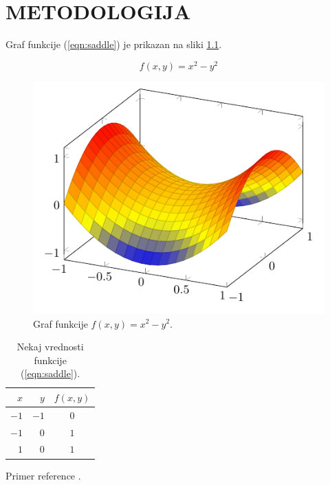 \chapter{METODOLOGIJA}

\noindent
Graf funkcije (\ref{eqn:saddle}) je prikazan na sliki \ref{fig:plot}.

\begin{equation}
    f(x, y) = x^2 - y^2
    \label{eqn:saddle}
\end{equation}

\begin{figure}[ht]
    \centering
    \includegraphics[width=0.6\linewidth]{images/plot.pdf}
    \caption{Graf funkcije $f(x, y) = x^2 - y^2$.}
    \label{fig:plot}
\end{figure}

\begin{table}[ht]
    \centering
    \caption{Nekaj vrednosti funkcije (\ref{eqn:saddle}).}
    \begin{tabular}{|rr|c|}
        \hline
        $x$  & $y$  & $f(x, y)$ \\
        \hline
        $-1$ & $-1$ & $0$ \\
        $-1$ & $0$  & $1$ \\
        $1$ & $0$   & $1$ \\
        \hline
    \end{tabular}
\end{table}

\noindent
Primer reference \cite{RussellNorvig2021}.